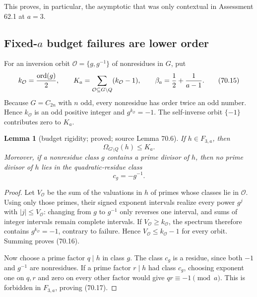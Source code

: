 \documentclass[10pt,reqno]{amsart}
\newtheorem{lemma}[theorem]{Lemma}
\theoremstyle{definition}
\newcommand{\1}{\mathbf 1}
\begin{document}
This proves, in particular, the asymptotic that was only contextual in
Assessment 62.1 at $a=3$.

\subsection{Fixed-$a$ budget failures are lower order}

For an inversion orbit ${\mathcal O}=\{g,g^{-1}\}$ of nonresidues in $G$,
put
\begin{equation}
 k_{\mathcal O}={\operatorname {ord}(g)\over2},\qquad
 K_a=\sum_{{\mathcal O}\subseteq G\setminus Q}(k_{\mathcal O}-1),
 \qquad \beta_a={1\over2}+{1\over a-1}.                   \tag{70.15}
\end{equation}
Because $G=C_{2n}$ with $n$ odd, every nonresidue has order twice an
odd number.  Hence $k_{\mathcal O}$ is an odd positive integer and
$g^{k_{\mathcal O}}=-1$.  The self-inverse orbit $\{-1\}$ contributes zero
to $K_a$.

\begin{lemma}[budget rigidity; proved; source Lemma 70.6]\label{lem:budget-rigidity}  If $h\in F_{3,a}$, then
\begin{equation}
             \Omega_{G\setminus Q}(h)\leq K_a.             \tag{70.16}
\end{equation}
Moreover, if a nonresidue class $g$ contains a prime divisor of $h$,
then no prime divisor of $h$ lies in the quadratic-residue class
\begin{equation}
                         c_g=-g^{-1}.                      \tag{70.17}
\end{equation}

\end{lemma}
\begin{proof} Let $V_{\mathcal O}$ be the sum of the valuations in $h$ of
primes whose classes lie in ${\mathcal O}$.  Using only those primes, their
signed exponent intervals realize every power $g^j$ with
$|j|\leq V_{\mathcal O}$: changing from $g$ to $g^{-1}$ only reverses
one interval, and sums of integer intervals remain complete intervals.  If
$V_{\mathcal O}\geq k_{\mathcal O}$, the spectrum therefore contains
$g^{k_{\mathcal O}}=-1$, contrary to failure.  Hence
$V_{\mathcal O}\leq k_{\mathcal O}-1$ for every orbit.  Summing proves (70.16).

Now choose a prime factor $q\mid h$ in class $g$.  The class $c_g$ is
a residue, since both $-1$ and $g^{-1}$ are nonresidues.  If a prime
factor $r\mid h$ had class $c_g$, choosing exponent one on $q,r$ and
zero on every other factor would give $qr\equiv-1\pmod a$.  This is
forbidden in $F_{3,a}$, proving (70.17).
\end{proof}
\end{document}

